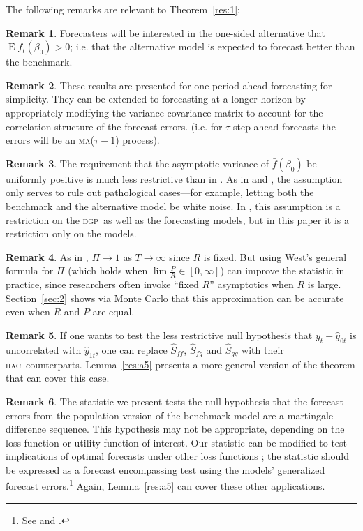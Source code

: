 \documentclass[10pt,fleqn,draft]{article}
\theoremstyle{definition}
\newtheorem{rem}{Remark}
\DeclareMathOperator{\E}{E}
\newcommand{\dgp}{\textsc{dgp}}
\newcommand{\hac}{\textsc{hac}}
\newcommand{\ma}{\textsc{ma}}
\begin{document}
The following remarks are relevant to Theorem~\ref{res:1}:

\begin{rem}
  Forecasters will be interested in the one-sided alternative that $\E
  f_t(\beta_0) > 0$; i.e. that the alternative model is expected to
  forecast better than the benchmark.
\end{rem}

\begin{rem}
  These results are presented for one-period-ahead forecasting for
  simplicity.  They can be extended to forecasting at a longer horizon
  by appropriately modifying the variance-covariance matrix to account
  for the correlation structure of the forecast errors. (i.e. for
  $\tau$-step-ahead forecasts the errors will be an \ma($\tau-1$) process).
\end{rem}

\begin{rem}
  The requirement that the asymptotic variance of $\bar f(\beta_0)$ be
  uniformly positive is much less restrictive than in \cite{Wes:96}.
  As in \cite{GiW:06} and \citet{ClW:06,ClW:07}, the assumption only
  serves to rule out pathological cases---for example, letting both
  the benchmark and the alternative model be white noise. In
  \citet{Wes:96}, this assumption is a restriction on the \dgp\ as
  well as the forecasting models, but in this paper it is a
  restriction only on the models.
\end{rem}

\begin{rem}
  As in \citet{Wes:96}, $\Pi \to 1$ as $T \to \infty$ since $R$ is
  fixed.  But using West's general formula for $\Pi$ (which holds when
  $\lim \tfrac{P}{R} \in [0,\infty]$) can improve the statistic in practice,
  since researchers often invoke ``fixed $R$'' asymptotics when $R$ is
  large.  Section~\ref{sec:2} shows via Monte Carlo that this
  approximation can be accurate even when $R$ and $P$ are equal.
\end{rem}

\begin{rem}
  If one wants to test the less restrictive null hypothesis that
  $y_{t} - \hat{y}_{0t}$ is uncorrelated with $\hat{y}_{1t}$, one can
  replace $\hat{S}_{ff}$, $\hat{S}_{fg}$ and $\hat{S}_{gg}$ with their
  \hac\ counterparts.  Lemma~\ref{res:a5} presents a more general
  version of the theorem that can cover this case.
\end{rem}

\begin{rem}
  The statistic we present tests the null hypothesis that the forecast
  errors from the population version of the benchmark model are a
  martingale difference sequence.  This hypothesis may not be
  appropriate, depending on the loss function or utility function of
  interest.  Our statistic can be modified to test implications of
  optimal forecasts under other loss functions
  \citep[see][]{PaT:07,PaT:07b}; the statistic should be expressed as
  a forecast encompassing test using the models' generalized forecast
  errors.\footnote{See \citet{HLN:98} and \citet[Section~4]{ClW:07}.}
  Again, Lemma~\ref{res:a5} can cover these other applications.
\end{rem}
\end{document}
